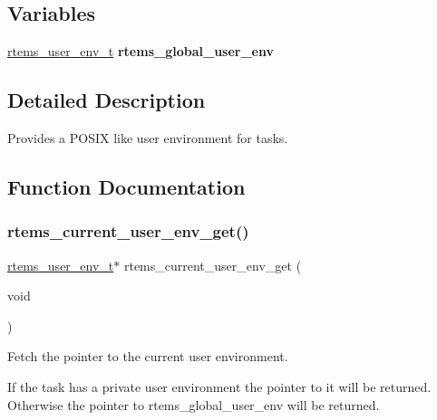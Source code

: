 \subsection*{Variables}
\begin{DoxyCompactItemize}
\item 
\mbox{\label{group__LibIOEnv_gaf6306cec81547b5129203e798117d18b}} 
\mbox{\hyperlink{structrtems__user__env__t}{rtems\+\_\+user\+\_\+env\+\_\+t}} {\bfseries rtems\+\_\+global\+\_\+user\+\_\+env}
\end{DoxyCompactItemize}


\subsection{Detailed Description}
Provides a P\+O\+S\+IX like user environment for tasks. 



\subsection{Function Documentation}
\mbox{\label{group__LibIOEnv_gae0ea3b12bb890c1f272b6d049a486160}} 
\subsubsection{\texorpdfstring{rtems\_current\_user\_env\_get()}{rtems\_current\_user\_env\_get()}}
{\footnotesize\ttfamily \mbox{\hyperlink{structrtems__user__env__t}{rtems\+\_\+user\+\_\+env\+\_\+t}}$\ast$ rtems\+\_\+current\+\_\+user\+\_\+env\+\_\+get (\begin{DoxyParamCaption}\item[{void}]{ }\end{DoxyParamCaption})}



Fetch the pointer to the current user environment. 

If the task has a private user environment the pointer to it will be returned. Otherwise the pointer to rtems\+\_\+global\+\_\+user\+\_\+env will be returned. \mbox{\label{group__LibIOEnv_ga24e63d00d8f74b3bf2a6d86f0b26a826}} 
